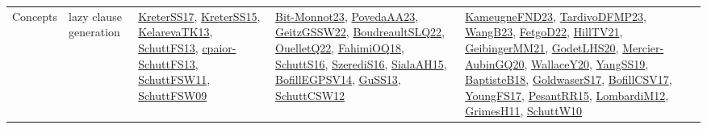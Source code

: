 {\begin{longtable}{lp{3cm}>{\raggedright}p{6cm}>{\raggedright}p{6cm}p{8cm}}
Concepts & lazy clause generation & \href{articles/KreterSS17.pdf}{KreterSS17}\cite{KreterSS17}, \href{papers/KreterSS15.pdf}{KreterSS15}\cite{KreterSS15}, \href{papers/KelarevaTK13.pdf}{KelarevaTK13}\cite{KelarevaTK13}, \href{papers/SchuttFS13.pdf}{SchuttFS13}\cite{SchuttFS13}, \href{papers/cpaior-SchuttFS13.pdf}{cpaior-SchuttFS13}\cite{cpaior-SchuttFS13}, \href{articles/SchuttFSW11.pdf}{SchuttFSW11}\cite{SchuttFSW11}, \href{papers/SchuttFSW09.pdf}{SchuttFSW09}\cite{SchuttFSW09} & \href{papers/Bit-Monnot23.pdf}{Bit-Monnot23}\cite{Bit-Monnot23}, \href{papers/PovedaAA23.pdf}{PovedaAA23}\cite{PovedaAA23}, \href{papers/GeitzGSSW22.pdf}{GeitzGSSW22}\cite{GeitzGSSW22}, \href{papers/BoudreaultSLQ22.pdf}{BoudreaultSLQ22}\cite{BoudreaultSLQ22}, \href{papers/OuelletQ22.pdf}{OuelletQ22}\cite{OuelletQ22}, \href{articles/FahimiOQ18.pdf}{FahimiOQ18}\cite{FahimiOQ18}, \href{papers/SchuttS16.pdf}{SchuttS16}\cite{SchuttS16}, \href{papers/SzerediS16.pdf}{SzerediS16}\cite{SzerediS16}, \href{papers/SialaAH15.pdf}{SialaAH15}\cite{SialaAH15}, \href{papers/BofillEGPSV14.pdf}{BofillEGPSV14}\cite{BofillEGPSV14}, \href{papers/GuSS13.pdf}{GuSS13}\cite{GuSS13}, \href{papers/SchuttCSW12.pdf}{SchuttCSW12}\cite{SchuttCSW12} & \href{papers/KameugneFND23.pdf}{KameugneFND23}\cite{KameugneFND23}, \href{papers/TardivoDFMP23.pdf}{TardivoDFMP23}\cite{TardivoDFMP23}, \href{papers/WangB23.pdf}{WangB23}\cite{WangB23}, \href{articles/FetgoD22.pdf}{FetgoD22}\cite{FetgoD22}, \href{papers/HillTV21.pdf}{HillTV21}\cite{HillTV21}, \href{papers/GeibingerMM21.pdf}{GeibingerMM21}\cite{GeibingerMM21}, \href{papers/GodetLHS20.pdf}{GodetLHS20}\cite{GodetLHS20}, \href{papers/Mercier-AubinGQ20.pdf}{Mercier-AubinGQ20}\cite{Mercier-AubinGQ20}, \href{articles/WallaceY20.pdf}{WallaceY20}\cite{WallaceY20}, \href{papers/YangSS19.pdf}{YangSS19}\cite{YangSS19}, \href{articles/BaptisteB18.pdf}{BaptisteB18}\cite{BaptisteB18}, \href{papers/GoldwaserS17.pdf}{GoldwaserS17}\cite{GoldwaserS17}, \href{papers/BofillCSV17.pdf}{BofillCSV17}\cite{BofillCSV17}, \href{papers/YoungFS17.pdf}{YoungFS17}\cite{YoungFS17}, \href{papers/PesantRR15.pdf}{PesantRR15}\cite{PesantRR15}, \href{articles/LombardiM12.pdf}{LombardiM12}\cite{LombardiM12}, \href{papers/GrimesH11.pdf}{GrimesH11}\cite{GrimesH11}, \href{papers/SchuttW10.pdf}{SchuttW10}\cite{SchuttW10}\\

\end{longtable}}
